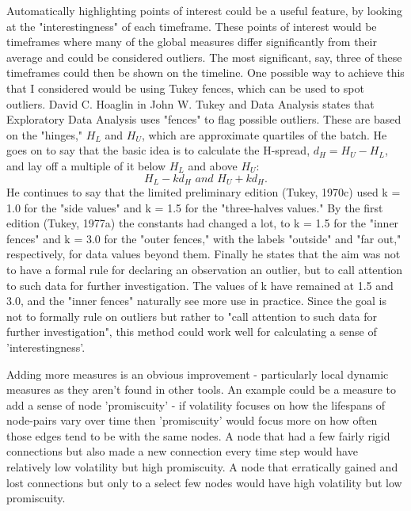 Automatically highlighting points of interest could be a useful feature, by looking at the "interestingness" of each timeframe. These points of interest would be timeframes where many of the global measures differ significantly from their average and could be considered outliers. The most significant, say, three of these timeframes could then be shown on the timeline. One possible way to achieve this that I considered would be using Tukey fences, which can be used to spot outliers. David C. Hoaglin in John W. Tukey and Data Analysis \cite{jwtada} states that Exploratory Data Analysis \cite{eda} uses "fences" to flag possible outliers. These are based on the "hinges," $H_L$ and $H_U$, which are approximate quartiles of the batch. He goes on to say that the basic idea is to calculate the H-spread, $d_H = H_U - H_L$, and lay off a multiple of it below $H_L$ and above $H_U$: 
\begin{equation}
 H_L-kd_H \, \, and \, \, H_U + kd_H.
\end{equation}
He continues to say that the limited preliminary edition (Tukey, 1970c) used k = 1.0 for the "side values" and k = 1.5 for the "three-halves values." By the first edition (Tukey, 1977a) the constants had changed a lot, to k = 1.5 for the "inner fences" and k = 3.0 for the "outer fences," with the labels "outside" and "far out," respectively, for data values beyond them.
Finally he states that the aim was not to have a formal rule for declaring an observation an outlier, but to call attention to such data for further investigation. The values of k have remained at 1.5 and 3.0, and the "inner fences" naturally see more use in practice. 
Since the goal is not to formally rule on outliers but rather to "call attention to such data for further investigation", this method could work well for calculating a sense of 'interestingness'.
\newline

Adding more measures is an obvious improvement - particularly local dynamic measures as they aren't found in other tools. An example could be a measure to add a sense of node 'promiscuity' - if volatility focuses on how the lifespans of node-pairs vary over time then 'promiscuity' would focus more on how often those edges tend to be with the same nodes. A node that had a few fairly rigid connections but also made a new connection every time step would have relatively low volatility but high promiscuity. A node that erratically gained and lost connections but only to a select few nodes would have high volatility but low promiscuity.
\newline

